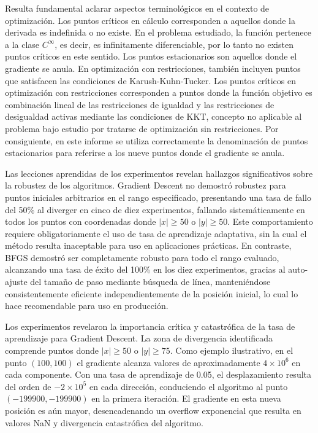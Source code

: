 \documentclass[12pt,a4paper]{article}
\begin{document}
Resulta fundamental aclarar aspectos terminológicos en el contexto de optimización. Los puntos críticos en cálculo corresponden a aquellos donde la derivada es indefinida o no existe. En el problema estudiado, la función pertenece a la clase $C^{\infty}$, es decir, es infinitamente diferenciable, por lo tanto no existen puntos críticos en este sentido. Los puntos estacionarios son aquellos donde el gradiente se anula. En optimización con restricciones, también incluyen puntos que satisfacen las condiciones de Karush-Kuhn-Tucker. Los puntos críticos en optimización con restricciones corresponden a puntos donde la función objetivo es combinación lineal de las restricciones de igualdad y las restricciones de desigualdad activas mediante las condiciones de KKT, concepto no aplicable al problema bajo estudio por tratarse de optimización sin restricciones. Por consiguiente, en este informe se utiliza correctamente la denominación de puntos estacionarios para referirse a los nueve puntos donde el gradiente se anula.

Las lecciones aprendidas de los experimentos revelan hallazgos significativos sobre la robustez de los algoritmos. Gradient Descent no demostró robustez para puntos iniciales arbitrarios en el rango especificado, presentando una tasa de fallo del 50\% al diverger en cinco de diez experimentos, fallando sistemáticamente en todos los puntos con coordenadas donde $|x| \geq 50$ o $|y| \geq 50$. Este comportamiento requiere obligatoriamente el uso de tasa de aprendizaje adaptativa, sin la cual el método resulta inaceptable para uso en aplicaciones prácticas. En contraste, BFGS demostró ser completamente robusto para todo el rango evaluado, alcanzando una tasa de éxito del 100\% en los diez experimentos, gracias al auto-ajuste del tamaño de paso mediante búsqueda de línea, manteniéndose consistentemente eficiente independientemente de la posición inicial, lo cual lo hace recomendable para uso en producción.

Los experimentos revelaron la importancia crítica y catastrófica de la tasa de aprendizaje para Gradient Descent. La zona de divergencia identificada comprende puntos donde $|x| \geq 50$ o $|y| \geq 75$. Como ejemplo ilustrativo, en el punto $(100, 100)$ el gradiente alcanza valores de aproximadamente $4 \times 10^6$ en cada componente. Con una tasa de aprendizaje de 0.05, el desplazamiento resulta del orden de $-2 \times 10^5$ en cada dirección, conduciendo el algoritmo al punto $(-199900, -199900)$ en la primera iteración. El gradiente en esta nueva posición es aún mayor, desencadenando un overflow exponencial que resulta en valores NaN y divergencia catastrófica del algoritmo.
\end{document}
